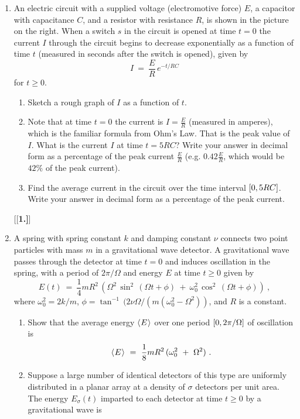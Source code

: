 {\begin{enumerate}[\bfseries 1.]
 \item An electric circuit with a supplied voltage (electromotive force) $E$,
 a capacitor with capacitance $C$, and a resistor with resistance $R$, is shown in
 the picture on the right. When a switch $s$ in the circuit is opened at time
 $t=0$ the current $I$ through the circuit begins to decrease exponentially as a
 function of time $t$ (measured in seconds after the switch is opened), given by
\[
I ~=~ \frac{E}{R}\,e^{-t/RC}
\]
for $t \ge 0$.
 \begin{enumerate}[\bfseries (a)]
  \item Sketch a rough graph of $I$ as a function of $t$.
  \item Note that at time $t=0$ the current is $I = \frac{E}{R}$ (measured in
   amperes), which is the familiar formula from Ohm's Law. That is the peak
   value of $I$. What is the current $I$ at time $t=5RC$? Write your answer in
   decimal form as a percentage of the peak current $\frac{E}{R}$ (e.g.
   $0.42 \frac{E}{R}$, which would be $42\%$ of the peak current).
  \item Find the average current in the circuit over the time interval
   $\lbrack 0,5RC \rbrack$. Write your answer in decimal form as a percentage of the
   peak current.
  \end{enumerate}
[{[\bfseries 1.]}]
 \item A spring with spring constant $k$ and damping constant $\nu$ connects
  two point particles with mass $m$ in a gravitational wave detector.
  A gravitational wave passes through the detector at time $t=0$ and induces
  oscillation in the spring, with a period of $2\pi/\Omega$ and energy $E$ at
  time $t \ge 0$ given by
\[
E(t) ~=~ \frac{1}{4}mR^2\,\left(\Omega^2\,\sin^2\,(\Omega t + \phi) ~+~
         \omega_0^2\,\cos^2\,(\Omega t + \phi)\right) ~,
\]
where $\omega_0^2 = 2k/m$, $\phi =
\tan^{-1}\,(2\nu\Omega/(m(\omega_0^2 - \Omega^2))$, and $R$ is a constant.
  \begin{enumerate}[\bfseries (a)]
   \item Show that the average energy $\langle\mspace{1mu}E\mspace{1mu}\rangle$ over one period
    $\lbrack 0,2\pi/\Omega \rbrack$ of oscillation is
\[
\langle\mspace{1mu}E\mspace{1mu}\rangle ~=~ \frac{1}{8}mR^2\,(\omega_0^2 ~+~ \Omega^2) ~.
\]
   \item Suppose a large number of identical detectors of this type are
    uniformly distributed in a planar array at a density of $\sigma$ detectors
    per unit area. The energy $E_\sigma(t)$ imparted to each detector at time
    $t \ge 0$ by a gravitational wave is

\end{enumerate}
\end{enumerate}}
